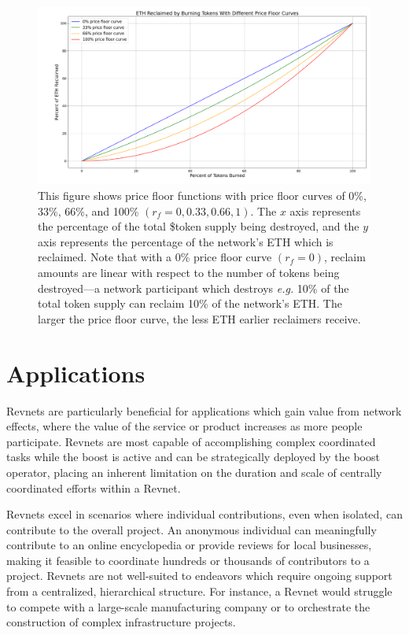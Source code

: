 \documentclass{article}
\begin{document}
\begin{figure}[ht]
  \centering
  \includegraphics[width=\textwidth]{figures/multi-floor-curves.png}
  \caption{This figure shows price floor functions with price floor curves of 0\%, 33\%, 66\%, and 100\% $(r_f = 0, 0.33, 0.66, 1)$. The $x$ axis represents the percentage of the total \$token supply being destroyed, and the $y$ axis represents the percentage of the network's ETH which is reclaimed. Note that with a 0\% price floor curve $(r_f = 0)$, reclaim amounts are linear with respect to the number of tokens being destroyed---a network participant which destroys \textit{e.g.} 10\% of the total token supply can reclaim 10\% of the network's ETH. The larger the price floor curve, the less ETH earlier reclaimers receive.}
\end{figure}

\section{Applications}

Revnets are particularly beneficial for applications which gain value from network effects, where the value of the service or product increases as more people participate. Revnets are most capable of accomplishing complex coordinated tasks while the boost is active and can be strategically deployed by the boost operator, placing an inherent limitation on the duration and scale of centrally coordinated efforts within a Revnet.

Revnets excel in scenarios where individual contributions, even when isolated, can contribute to the overall project. An anonymous individual can meaningfully contribute to an online encyclopedia or provide reviews for local businesses, making it feasible to coordinate hundreds or thousands of contributors to a project. Revnets are not well-suited to endeavors which require ongoing support from a centralized, hierarchical structure. For instance, a Revnet would struggle to compete with a large-scale manufacturing company or to orchestrate the construction of complex infrastructure projects.
\end{document}
